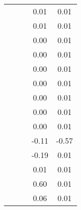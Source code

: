 \begin{table}
\begin{tabular}{c|cc|cc|}
\multicolumn{1}{|c|}{} & \multicolumn{1}{|c|}{} & \multicolumn{1}{|c|}{} & \multicolumn{1}{|c|}{      0.01} & \multicolumn{1}{|c|}{      0.01} \\ 
\multicolumn{1}{|c|}{} & \multicolumn{1}{|c|}{} & \multicolumn{1}{|c|}{} & \multicolumn{1}{|c|}{      0.01} & \multicolumn{1}{|c|}{      0.01} \\ 
\multicolumn{1}{|c|}{} & \multicolumn{1}{|c|}{} & \multicolumn{1}{|c|}{} & \multicolumn{1}{|c|}{      0.00} & \multicolumn{1}{|c|}{      0.01} \\ 
\multicolumn{1}{|c|}{} & \multicolumn{1}{|c|}{} & \multicolumn{1}{|c|}{} & \multicolumn{1}{|c|}{      0.00} & \multicolumn{1}{|c|}{      0.01} \\ 
\multicolumn{1}{|c|}{} & \multicolumn{1}{|c|}{} & \multicolumn{1}{|c|}{} & \multicolumn{1}{|c|}{      0.00} & \multicolumn{1}{|c|}{      0.01} \\ 
\multicolumn{1}{|c|}{} & \multicolumn{1}{|c|}{} & \multicolumn{1}{|c|}{} & \multicolumn{1}{|c|}{      0.00} & \multicolumn{1}{|c|}{      0.01} \\ 
\multicolumn{1}{|c|}{} & \multicolumn{1}{|c|}{} & \multicolumn{1}{|c|}{} & \multicolumn{1}{|c|}{      0.00} & \multicolumn{1}{|c|}{      0.01} \\ 
\multicolumn{1}{|c|}{} & \multicolumn{1}{|c|}{} & \multicolumn{1}{|c|}{} & \multicolumn{1}{|c|}{      0.00} & \multicolumn{1}{|c|}{      0.01} \\ 
\multicolumn{1}{|c|}{} & \multicolumn{1}{|c|}{} & \multicolumn{1}{|c|}{} & \multicolumn{1}{|c|}{      0.00} & \multicolumn{1}{|c|}{      0.01} \\ 
\multicolumn{1}{|c|}{} & \multicolumn{1}{|c|}{} & \multicolumn{1}{|c|}{} & \multicolumn{1}{|c|}{     -0.11} & \multicolumn{1}{|c|}{     -0.57} \\ 
\multicolumn{1}{|c|}{} & \multicolumn{1}{|c|}{} & \multicolumn{1}{|c|}{} & \multicolumn{1}{|c|}{     -0.19} & \multicolumn{1}{|c|}{      0.01} \\ 
\multicolumn{1}{|c|}{} & \multicolumn{1}{|c|}{} & \multicolumn{1}{|c|}{} & \multicolumn{1}{|c|}{      0.01} & \multicolumn{1}{|c|}{      0.01} \\ 
\multicolumn{1}{|c|}{} & \multicolumn{1}{|c|}{} & \multicolumn{1}{|c|}{} & \multicolumn{1}{|c|}{      0.60} & \multicolumn{1}{|c|}{      0.01} \\ 
\multicolumn{1}{|c|}{} & \multicolumn{1}{|c|}{} & \multicolumn{1}{|c|}{} & \multicolumn{1}{|c|}{      0.06} & \multicolumn{1}{|c|}{      0.01} \\ 

\end{tabular}
\end{table}
